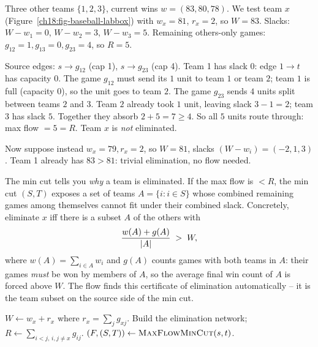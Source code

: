 \begin{labbox}
Three other teams $\{1,2,3\}$, current wins $w=(83, 80, 78)$. We test team $x$ (Figure~\ref{ch18:fig-baseball-labbox}) with $w_x=81$, $r_x=2$, so $W = 83$. Slacks: $W-w_1 = 0$, $W-w_2 = 3$, $W-w_3 = 5$. Remaining others-only games: $g_{12}=1, g_{13}=0, g_{23}=4$, so $R = 5$.
\par
Source edges: $s\to g_{12}$ (cap 1), $s\to g_{23}$ (cap 4). Team 1 has slack $0$: edge $1\to t$ has capacity $0$. The game $g_{12}$ must send its $1$ unit to team $1$ or team $2$; team $1$ is full (capacity $0$), so the unit goes to team $2$. The game $g_{23}$ sends $4$ units split between teams $2$ and $3$. Team $2$ already took $1$ unit, leaving slack $3-1 = 2$; team $3$ has slack $5$. Together they absorb $2 + 5 = 7 \ge 4$. So all $5$ units route through: max flow $=5=R$. Team $x$ is \emph{not} eliminated.
\par
Now suppose instead $w_x = 79, r_x = 2$, so $W = 81$, slacks $(W-w_i) = (-2, 1, 3)$. Team 1 already has $83 > 81$: trivial elimination, no flow needed.
\end{labbox}

\begin{whybox}
The min cut tells you \emph{why} a team is eliminated. If the max flow is $< R$, the min cut $(S,T)$ exposes a set of teams $A = \{i : i\in S\}$ whose combined remaining games among themselves cannot fit under their combined slack. Concretely, eliminate $x$ iff there is a subset $A$ of the others with
\[
  \frac{w(A) + g(A)}{\lvert A\rvert} \;>\; W,
\]
where $w(A)=\sum_{i\in A} w_i$ and $g(A)$ counts games with both teams in $A$: their games \emph{must} be won by members of $A$, so the average final win count of $A$ is forced above $W$. The flow finds this certificate of elimination automatically -- it is the team subset on the source side of the min cut.
\end{whybox}

\begin{algorithm}[H]
\caption{Is team $x$ eliminated?}
\label{ch18:alg-baseball}
\DontPrintSemicolon
{}
$W \gets w_x + r_x$ where $r_x = \sum_{j} g_{xj}$.\;
Build the elimination network; $R \gets \sum_{i<j,\,i,j\ne x} g_{ij}$.\;
$(F,(S,T)) \gets \textsc{MaxFlowMinCut}(s,t)$.\;
\end{algorithm}


